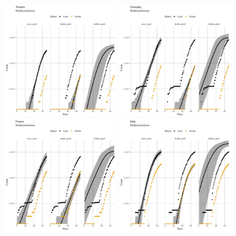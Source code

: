 \documentclass[a4paper]{tufte-handout}
\begin{document}
\begin{figure}
  \begin{center}
    \includegraphics[width=0.45\textwidth]{../figs/model_pred_AUT.pdf}
    \includegraphics[width=0.45\textwidth]{../figs/model_pred_DEU.pdf}
    \includegraphics[width=0.45\textwidth]{../figs/model_pred_FRA.pdf}
    \includegraphics[width=0.45\textwidth]{../figs/model_pred_ITA.pdf}

\end{center}
\end{figure}
\end{document}

